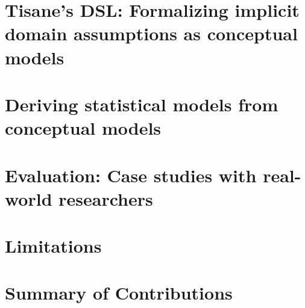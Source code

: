 \section{Tisane's DSL: Formalizing implicit domain assumptions as conceptual models}

\section{Deriving statistical models from conceptual models}

\section{Evaluation: Case studies with real-world researchers}

\section{Limitations}
\section{Summary of Contributions}